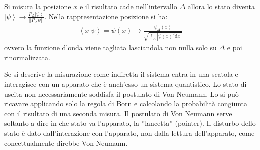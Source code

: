 Si misura la posizione $x$ e il risultato cade nell'intervallo $\Delta$ allora lo stato diventa $\left |\psi  \right\rangle \rightarrow \frac{P_\Delta\left |\psi  \right\rangle}{||P_\Delta\psi ||}$. Nella rappresentazione posizione si ha:
\begin{equation*}\begin{split}
\left\langle x|\psi  \right\rangle=\psi \left(x\right) \rightarrow \frac{\psi _\Delta\left(x\right)}{\sqrt{\int_{\Delta}{|\psi \left(x\right)^2\textrm{d}x|}}}
\end{split}\end{equation*}
ovvero la funzione d'onda viene tagliata lasciandola non nulla solo su $\Delta$ e poi rinormalizzata.


Se si descrive la misurazione come indiretta il sistema entra in una scatola e interagisce con un apparato che è anch'esso un sistema quantistico. Lo stato di uscita non necessariamente soddisfa il postulato di Von Neumann. Lo si può ricavare applicando solo la regola di Born e calcolando la probabilità congiunta con il risultato di una seconda misura. Il postulato di Von Neumann serve soltanto a dire in che stato va l'apparato, la ''lancetta'' (pointer). Il disturbo dello stato è dato dall'interazione con l'apparato, non dalla lettura dell'apparato, come concettualmente direbbe Von Neumann.


%